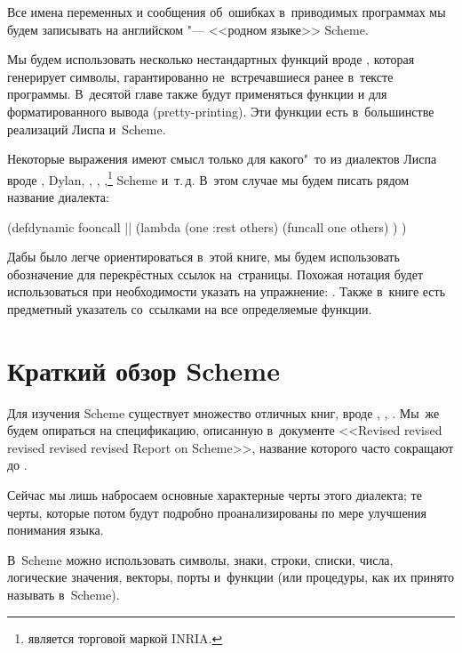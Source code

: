 Все имена переменных и сообщения об~ошибках в~приводимых программах мы будем
записывать на английском "--- <<родном языке>> Scheme.

Мы будем использовать несколько нестандартных функций вроде , которая
генерирует символы, гарантированно не~встречавшиеся ранее в~тексте программы.
В~десятой главе также будут применяться функции  и  для
форматированного вывода (pretty-printing). Эти функции есть в~большинстве
реализаций Лиспа и~Scheme.

Некоторые выражения имеют смысл только для какого"~то из диалектов Лиспа вроде
\CommonLisp, Dylan, \EuLisp, \ISLisp, \LeLisp,\footnote*{{\LeLisp} является
торговой маркой INRIA.} Scheme и~т.\,д. В~этом случае мы будем писать рядом
название диалекта:

\begin{code:lisp}
(defdynamic fooncall          |\dialect{\ISLisp}|
  (lambda (one :rest others)
    (funcall one others) ) )
\end{code:lisp}

Дабы было легче ориентироваться в~этой книге, мы будем использовать
обозначение {\seePage*} для перекрёстных ссылок на~страницы. Похожая нотация
будет использоваться при необходимости указать на упражнение: {\seeEx*}. Также
в~книге есть предметный указатель со~ссылками на все определяемые функции.


\section*{Краткий обзор Scheme}\label{pref/sect:scheme-summary}

Для изучения Scheme существует множество отличных книг, вроде \cite{as85},
\cite{dyb87}, \cite{sf89}. Мы~же будем опираться на спецификацию, описанную
в~документе <<Revised revised revised revised revised Report on Scheme>>,
название которого часто сокращают до \RnRS.~\cite{kcr98}

Сейчас мы лишь набросаем основные характерные черты этого диалекта; те черты,
которые потом будут подробно проанализированы по мере улучшения понимания языка.

В~Scheme можно использовать символы, знаки, строки, списки, числа, логические значения,
векторы, порты и~функции (или процедуры, как их принято называть в~Scheme).

